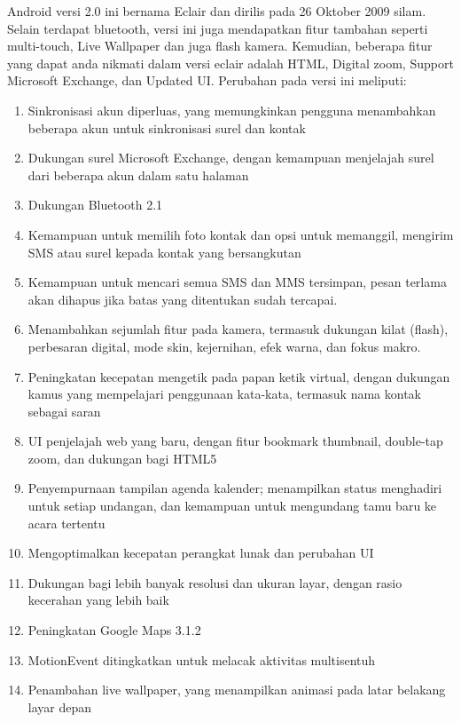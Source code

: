 \begin{enumerate}
Android versi 2.0 ini bernama Eclair dan dirilis pada 26 Oktober 2009 silam. Selain terdapat bluetooth, versi ini juga mendapatkan fitur tambahan seperti multi-touch, Live Wallpaper dan juga flash kamera. Kemudian, beberapa fitur yang dapat anda nikmati dalam versi eclair adalah HTML, Digital zoom, Support Microsoft Exchange, dan Updated UI. Perubahan pada versi ini meliputi:
\begin{enumerate}
    \item Sinkronisasi akun diperluas, yang memungkinkan pengguna menambahkan beberapa akun untuk sinkronisasi surel dan kontak
    \item Dukungan surel Microsoft Exchange, dengan kemampuan menjelajah surel dari beberapa akun dalam satu halaman
    \item Dukungan Bluetooth 2.1
    \item Kemampuan untuk memilih foto kontak dan opsi untuk memanggil, mengirim SMS atau surel kepada kontak yang bersangkutan
    \item Kemampuan untuk mencari semua SMS dan MMS tersimpan, pesan terlama akan dihapus jika batas yang ditentukan sudah tercapai.
    \item Menambahkan sejumlah fitur pada kamera, termasuk dukungan kilat (flash), perbesaran digital, mode skin, kejernihan, efek warna, dan fokus makro.
    \item Peningkatan kecepatan mengetik pada papan ketik virtual, dengan dukungan kamus yang mempelajari penggunaan kata-kata, termasuk nama kontak sebagai saran
    \item UI penjelajah web yang baru, dengan fitur bookmark thumbnail, double-tap zoom, dan dukungan bagi HTML5
    \item Penyempurnaan tampilan agenda kalender; menampilkan status menghadiri untuk setiap undangan, dan kemampuan untuk mengundang tamu baru ke acara tertentu
    \item Mengoptimalkan kecepatan perangkat lunak dan perubahan UI
    \item Dukungan bagi lebih banyak resolusi dan ukuran layar, dengan rasio kecerahan yang lebih baik
    \item Peningkatan Google Maps 3.1.2
    \item MotionEvent ditingkatkan untuk melacak aktivitas multisentuh
    \item Penambahan live wallpaper, yang menampilkan animasi pada latar belakang layar depan
\end{enumerate}


\end{enumerate}
